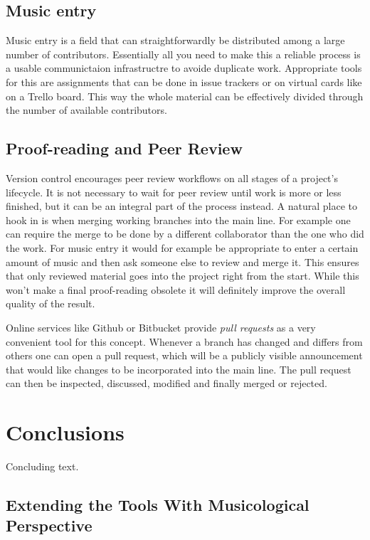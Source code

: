 \documentclass[11pt,a4paper]{article}
\begin{document}
\subsection{Music entry}
Music entry is a field that can straightforwardly be distributed among a large number
of contributors. Essentially all you need to make this a reliable process is a usable
communictaion infrastructre to avoide duplicate work.
Appropriate tools for this are assignments that can be done in issue trackers or on
virtual cards like on a Trello board. This way the whole material can be
effectively divided through the number of available contributors.

\subsection{Proof-reading and Peer Review}
Version control encourages peer review workflows on all stages of a project's lifecycle.
It is not necessary to wait for peer review until work is more or less finished, but it can be an integral part of the process instead. A natural place to hook in is when merging
working branches into the main line. For example one can require the merge to be done by
a different collaborator than the one who did the work. For music entry it would for
example be appropriate to enter a certain amount of music and then ask someone else
to review and merge it.
This ensures that only reviewed material goes into the project right from the
start. While this won't make a final proof-reading obsolete it will definitely improve
the overall quality of the result.

Online services like Github or Bitbucket provide \emph{pull requests} as a very convenient
tool for this concept. Whenever a branch has changed and differs from others one can
open a pull request, which will be a publicly visible announcement that would like changes
to be incorporated into the main line. The pull request can then be inspected, discussed,
modified and finally merged or rejected.


\section{Conclusions}\label{sec:conclusions}

Concluding text.


\subsection{Extending the Tools With Musicological Perspective}
\end{document}
